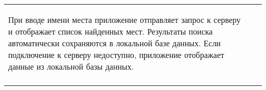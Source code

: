 \documentclass[a4paper]{article}
\begin{document}
\begin{tabular}{!{\vrule width 2pt}p{5cm}|p{6cm}|p{4cm}!{\vrule width 2pt}}
{\begin{minipage}{16cm}
\begin{enumerate}
При вводе имени места приложение отправляет запрос к серверу и отображает список найденных мест.
Результаты поиска автоматически сохраняются в локальной базе данных.
Если подключение к серверу недоступно, приложение отображает данные из локальной базы данных.
\end{enumerate}

\vspace{0.2cm}
    
\end{minipage}
}
\\
\end{tabular}

\newpage
\end{document}
